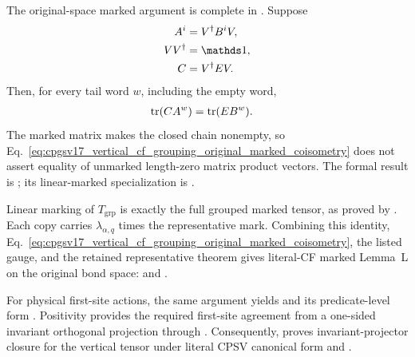 \documentclass{article}
\begin{document}
The original-space marked argument is complete in
. Suppose
\begin{align}
    A^i
     & =V^\dagger B^iV,
    \label{eq:cpgsv17_vertical_cf_grouping_original_space_reconstruction} \\
    VV^\dagger
     & =\Id,
    \label{eq:cpgsv17_vertical_cf_grouping_original_space_coisometry}     \\
    C
     & =V^\dagger EV.
    \label{eq:cpgsv17_vertical_cf_grouping_original_space_mark}
\end{align}
Then, for every tail word $w$, including the empty word,
\begin{align}
    \operatorname{tr}(CA^w)
     & =\operatorname{tr}(EB^w).
    \label{eq:cpgsv17_vertical_cf_grouping_original_marked_coisometry}
\end{align}
The marked matrix makes the closed chain nonempty, so
Eq.~\ref{eq:cpgsv17_vertical_cf_grouping_original_marked_coisometry} does not
assert equality of unmarked length-zero matrix product vectors. The formal
result is
; its
linear-marked specialization is
.

Linear marking of $T_{\mathrm{grp}}$ is exactly the full grouped marked tensor,
as proved by
.
Each copy carries $\lambda_{\alpha,q}$ times the representative mark.
Combining this identity,
Eq.~\ref{eq:cpgsv17_vertical_cf_grouping_original_marked_coisometry}, the
listed gauge, and the retained representative theorem gives literal-CF marked
Lemma~L on the original bond space:
and
.

For physical first-site actions, the same argument yields
and its predicate-level form
.
Positivity provides the required first-site agreement from a one-sided
invariant orthogonal projection through
.
Consequently,
proves invariant-projector closure for the vertical tensor under literal CPSV
canonical form and .
\end{document}
